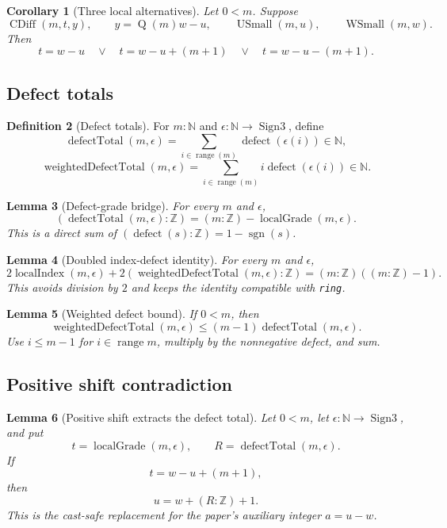 \documentclass[11pt]{article}
\theoremstyle{definition}
\newtheorem{definition}{Definition}[section]
\theoremstyle{plain}
\newtheorem{lemma}[definition]{Lemma}
\newtheorem{corollary}[definition]{Corollary}
\theoremstyle{remark}
\newcommand{\N}{\mathbb{N}}
\newcommand{\Z}{\mathbb{Z}}
\newcommand{\Sgn}{\operatorname{Sign3}}
\newcommand{\sgn}{\operatorname{sgn}}
\newcommand{\defect}{\operatorname{defect}}
\newcommand{\range}{\operatorname{range}}
\newcommand{\Qfun}{\operatorname{Q}}
\newcommand{\CDiff}{\operatorname{CDiff}}
\newcommand{\LGrade}{\operatorname{localGrade}}
\newcommand{\LIndex}{\operatorname{localIndex}}
\newcommand{\DTotal}{\operatorname{defectTotal}}
\newcommand{\WDTotal}{\operatorname{weightedDefectTotal}}
\newcommand{\USmall}{\operatorname{USmall}}
\newcommand{\WSmall}{\operatorname{WSmall}}
\begin{document}
\begin{corollary}[Three local alternatives]\label{cor:v9-three-local-alternatives}
Let \(0<m\).  Suppose
\[
        \CDiff(m,t,y),
        \qquad y=\Qfun(m)w-u,
        \qquad \USmall(m,u),
        \qquad \WSmall(m,w).
\]
Then
\[
        t=w-u
        \quad\vee\quad
        t=w-u+(m+1)
        \quad\vee\quad
        t=w-u-(m+1).
\]
\end{corollary}

\subsection{Defect totals}

\begin{definition}[Defect totals]\label{def:v9-defect-totals}
For \(m:\N\) and \(\epsilon:\N\to\Sgn\), define
\[
        \DTotal(m,\epsilon)=\sum_{i\in\range(m)}\defect(\epsilon(i))\in\N,
\]
\[
        \WDTotal(m,\epsilon)=\sum_{i\in\range(m)}i\defect(\epsilon(i))\in\N.
\]
\end{definition}

\begin{lemma}[Defect-grade bridge]\label{lem:v9-defect-grade}
For every \(m\) and \(\epsilon\),
\[
        (\DTotal(m,\epsilon):\Z)=(m:\Z)-\LGrade(m,\epsilon).
\]
This is a direct sum of \((\defect(s):\Z)=1-\sgn(s)\).
\end{lemma}

\begin{lemma}[Doubled index-defect identity]\label{lem:v9-doubled-index-defect}
For every \(m\) and \(\epsilon\),
\[
        2\LIndex(m,\epsilon)+2(\WDTotal(m,\epsilon):\Z)
        =(m:\Z)((m:\Z)-1).
\]
This avoids division by \(2\) and keeps the identity compatible with \verb|ring|.
\end{lemma}

\begin{lemma}[Weighted defect bound]\label{lem:v9-weighted-defect-bound}
If \(0<m\), then
\[
        \WDTotal(m,\epsilon)\le (m-1)\DTotal(m,\epsilon).
\]
Use \(i\le m-1\) for \(i\in\operatorname{range}m\), multiply by the nonnegative defect, and sum.
\end{lemma}

\subsection{Positive shift contradiction}

\begin{lemma}[Positive shift extracts the defect total]\label{lem:v9-pos-shift-defect}
Let \(0<m\), let \(\epsilon:\N\to\Sgn\), and put
\[
        t=\LGrade(m,\epsilon),
        \qquad
        R=\DTotal(m,\epsilon).
\]
If
\[
        t=w-u+(m+1),
\]
then
\[
        u=w+(R:\Z)+1.
\]
This is the cast-safe replacement for the paper's auxiliary integer \(a=u-w\).
\end{lemma}
\end{document}
